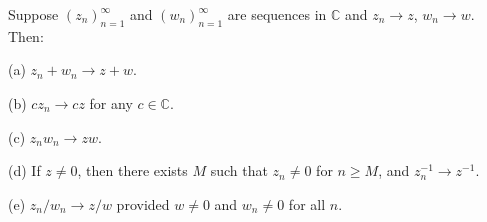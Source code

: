Suppose $(z_n)_{n=1}^{\infty}$ and $(w_n)_{n=1}^{\infty}$ are sequences in $\mathbb{C}$ and $z_n \to z$, $w_n \to w$. Then:

(a) $z_n + w_n \to z + w$.

(b) $c z_n \to c z$ for any $c \in \mathbb{C}$.

(c) $z_n w_n \to z w$.

(d) If $z \neq 0$, then there exists $M$ such that $z_n \neq 0$ for $n \geq M$, and $z_n^{-1} \to z^{-1}$.

(e) $z_n / w_n \to z / w$ provided $w \neq 0$ and $w_n \neq 0$ for all $n$.
